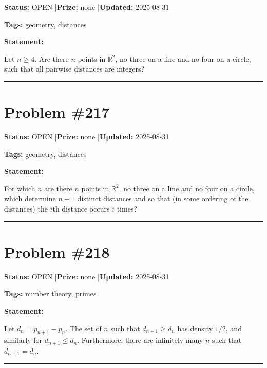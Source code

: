 \documentclass{article}
\begin{document}
\noindent\textbf{Status:} OPEN \quad|\quad \textbf{Prize:} none \quad|\quad \textbf{Updated:} 2025-08-31

\noindent\textbf{Tags:} geometry, distances

\medskip

\noindent\textbf{Statement:}

Let $n\geq 4$. Are there $n$ points in $\mathbb{R}^2$, no three on a line and no four on a circle, such that all pairwise distances are integers?

\noindent\rule{\linewidth}{0.4pt}


\section{Problem \#217}
\label{prob:217}

\noindent\textbf{Status:} OPEN \quad|\quad \textbf{Prize:} none \quad|\quad \textbf{Updated:} 2025-08-31

\noindent\textbf{Tags:} geometry, distances

\medskip

\noindent\textbf{Statement:}

For which $n$ are there $n$ points in $\mathbb{R}^2$, no three on a line and no four on a circle, which determine $n-1$ distinct distances and so that (in some ordering of the distances) the $i$th distance occurs $i$ times?

\noindent\rule{\linewidth}{0.4pt}


\section{Problem \#218}
\label{prob:218}

\noindent\textbf{Status:} OPEN \quad|\quad \textbf{Prize:} none \quad|\quad \textbf{Updated:} 2025-08-31

\noindent\textbf{Tags:} number theory, primes

\medskip

\noindent\textbf{Statement:}

Let $d_n=p_{n+1}-p_n$. The set of $n$ such that $d_{n+1}\geq d_n$ has density $1/2$, and similarly for $d_{n+1}\leq d_n$. Furthermore, there are infinitely many $n$ such that $d_{n+1}=d_n$.

\noindent\rule{\linewidth}{0.4pt}


\end{document}
